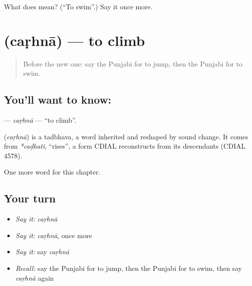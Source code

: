 \begin{tcolorbox}[breakable,colback=teal!4,colframe=teal!35!black,title={Before you move on}]
What does  mean? (\textquotedblleft{}To swim\textquotedblright{}.) Say it once more.
\end{tcolorbox}
\section[\texorpdfstring{\pa{ਚੜ੍ਹਨਾ} (caṛhnā)}{ਚੜ੍ਹਨਾ (caṛhnā)}]{ (caṛhnā) — to climb}

\label{lesson:PA-C149-carhna}



\begin{quote}
Before the new one: say the Punjabi for to jump, then the Punjabi for to swim.
\end{quote}

\subsection*{You'll want to know: }
\textbf{} — \emph{caṛhnā} — \textquotedblleft{}to climb\textquotedblright{}.

\begin{cousinweb}
\textbf{} (\emph{caṛhnā}) is a tadbhava, a word inherited and reshaped by sound change. It comes from \emph{*caḍhati}, \textquotedblleft{}rises\textquotedblright{}, a form CDIAL reconstructs from its descendants (CDIAL 4578).
\end{cousinweb}

\begin{grammarlens}[title={What you've built}]
One more word for this chapter.
\end{grammarlens}

\subsection*{Your turn}
\begin{itemize}
\raggedright
  \item \emph{Say it:} \emph{caṛhnā}
  \item \emph{Say it:} \emph{caṛhnā}, once more
  \item \emph{Say it:} say \emph{caṛhnā}
  \item \emph{Recall:} say the Punjabi for to jump, then the Punjabi for to swim, then say \emph{caṛhnā} again
\end{itemize}

